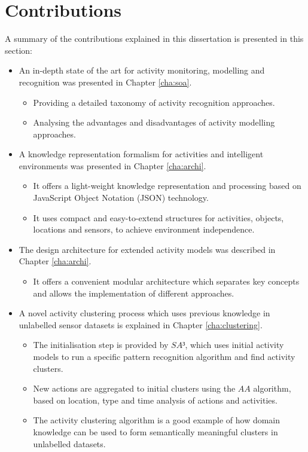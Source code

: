 \section{Contributions}
\label{sec:conclusions:contrib}

A summary of the contributions explained in this dissertation is presented in this section:

\begin{itemize}
 \item An in-depth state of the art for activity monitoring, modelling and recognition was presented in Chapter \ref{cha:soa}.
 \begin{itemize}
  \item Providing a detailed taxonomy of activity recognition approaches.
  \item Analysing the advantages and disadvantages of activity modelling approaches.
 \end{itemize}

 \item A knowledge representation formalism for activities and intelligent environments was presented in Chapter \ref{cha:archi}.
 \begin{itemize}
  \item It offers a light-weight knowledge representation and processing based on JavaScript Object Notation (JSON) technology.
  \item It uses compact and easy-to-extend structures for activities, objects, locations and sensors, to achieve environment independence.
 \end{itemize}

 \item The design architecture for extended activity models was described in Chapter \ref{cha:archi}.
 \begin{itemize}
  \item It offers a convenient modular architecture which separates key concepts and allows the implementation of different approaches.
 \end{itemize}

 \item A novel activity clustering process which uses previous knowledge in unlabelled sensor datasets is explained in Chapter \ref{cha:clustering}.
 \begin{itemize}
  \item The initialisation step is provided by $SA³$, which uses initial activity models to run a specific pattern recognition algorithm and find activity clusters.
  \item New actions are aggregated to initial clusters using the $AA$ algorithm, based on location, type and time analysis of actions and activities.
  \item The activity clustering algorithm is a good example of how domain knowledge can be used to form semantically meaningful clusters in unlabelled datasets.
 \end{itemize}


\end{itemize}
